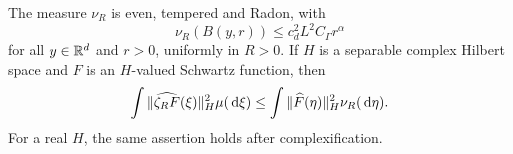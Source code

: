 \begin{proposition}\label{P:masked-auxiliary-norm}
  The measure $\nu_R$ is even, tempered and Radon, with
  \begin{equation}\label{E:masked-auxiliary-growth}
    \nu_R(B(y,r)) \le c_d^2L^2C_\Gamma r^\alpha
  \end{equation}
  for all $y \in \mathbb{R}^d$ and $r > 0$, uniformly in $R > 0$. If $H$ is a separable
  complex Hilbert space and $F$ is an $H$-valued Schwartz function, then
  \begin{equation}\label{E:masked-hilbert-fourier}
    \int \|\widehat{\zeta_RF}(\xi)\|_H^2\mu(\,\mathrm{d}\xi)
    \le \int \|\widehat{F}(\eta)\|_H^2\nu_R(\,\mathrm{d}\eta).
  \end{equation}
  For a real $H$, the same assertion holds after complexification.
\end{proposition}

